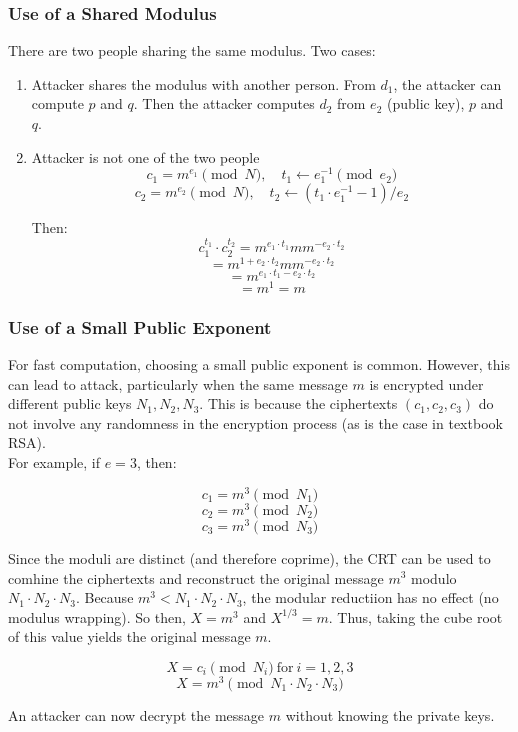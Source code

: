 \subsubsection{Use of a Shared Modulus}
There are two people sharing the same modulus. Two cases:
\begin{enumerate}
    \item Attacker shares the modulus with another person. From $d_1$, the attacker can compute $p$ and $q$. Then the attacker computes $d_2$ from $e_2$ (public key), $p$ and $q$.
    \item Attacker is not one of the two people
    \[ c_1 = m^{e_1} \pmod{N} , \quad t_1 \leftarrow e_1^{-1} \pmod{e_2}\]
    \[ c_2 = m^{e_2} \pmod{N} , \quad t_2 \leftarrow (t_1 \cdot e_1^{-1} -1) / e_2\]
    
    Then:
    \[ c_1^{t_1} \cdot c_2^{t_2} = m^{e_1 \cdot t_1}mm^{-e_2 \cdot t_2} \]
    \[ = m^{1 + e_2 \cdot t_2}mm^{-e_2 \cdot t_2} \]
    \[ = m^{e_1 \cdot t_1 -e_2 \cdot t_2} \]
    \[ = m^1 = m\]
\end{enumerate}

\subsubsection{Use of a Small Public Exponent}
For fast computation, choosing a small public exponent is common.
However, this can lead to attack, particularly when the same message $m$ 
is encrypted under different public keys $N_1, N_2, N_3$.
This is because the ciphertexts $(c_1, c_2, c_3)$ do not involve any randomness in the encryption process (as is the case in textbook RSA). \\

For example, if $e = 3$, then:

\[ c_1 = m^3 \pmod{N_1} \]
\[ c_2 = m^3 \pmod{N_2} \]
\[ c_3 = m^3 \pmod{N_3} \]

Since the moduli are distinct (and therefore coprime), the CRT can be used to comhine the ciphertexts 
and reconstruct the original message $m^3$ modulo $N_1 \cdot N_2 \cdot N_3$. 
Because $m^3 < N_1 \cdot N_2 \cdot N_3$, the modular reductiion has no effect (no modulus wrapping).
So then, $X= m^3$ and $X^{1/3} = m$.
Thus, taking the cube root of this value yields the original message $m$.

\[ X = c_i \pmod{N_i} \  \text{for} \ i = 1,2,3 \]
\[ X = m^3 \pmod{N_1 \cdot N_2 \cdot N_3} \]

An attacker can now decrypt the message $m$ without knowing the private keys.